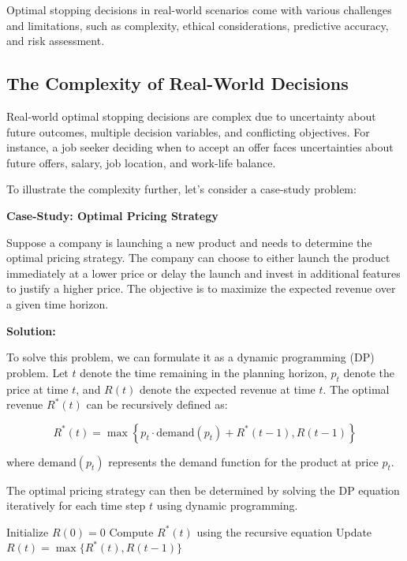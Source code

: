 \documentclass[12pt]{book} %
\begin{document}
Optimal stopping decisions in real-world scenarios come with various challenges and limitations, such as complexity, ethical considerations, predictive accuracy, and risk assessment.

\subsection{The Complexity of Real-World Decisions}

Real-world optimal stopping decisions are complex due to uncertainty about future outcomes, multiple decision variables, and conflicting objectives. For instance, a job seeker deciding when to accept an offer faces uncertainties about future offers, salary, job location, and work-life balance.

To illustrate the complexity further, let's consider a case-study problem:

\textbf{Case-Study: Optimal Pricing Strategy}

Suppose a company is launching a new product and needs to determine the optimal pricing strategy. The company can choose to either launch the product immediately at a lower price or delay the launch and invest in additional features to justify a higher price. The objective is to maximize the expected revenue over a given time horizon.

\textbf{Solution:}

To solve this problem, we can formulate it as a dynamic programming (DP) problem. Let \(t\) denote the time remaining in the planning horizon, \(p_t\) denote the price at time \(t\), and \(R(t)\) denote the expected revenue at time \(t\). The optimal revenue \(R^*(t)\) can be recursively defined as:

\[
R^*(t) = \max\left\{p_t \cdot \text{demand}(p_t) + R^*(t-1), R(t-1)\right\}
\]

where \(\text{demand}(p_t)\) represents the demand function for the product at price \(p_t\).

The optimal pricing strategy can then be determined by solving the DP equation iteratively for each time step \(t\) using dynamic programming.
\FloatBarrier
\begin{algorithm}
\caption{Dynamic Programming Algorithm for Optimal Pricing Strategy}\label{alg:pricing}
\begin{algorithmic}[1]
\State Initialize $R(0) = 0$
    \State Compute $R^*(t)$ using the recursive equation
    \State Update $R(t) = \max\{R^*(t), R(t-1)\}$
\EndFor
\end{algorithmic}
\end{algorithm}
\FloatBarrier
\end{document}
